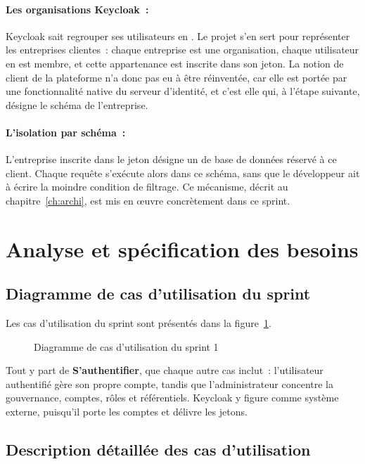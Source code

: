 \paragraph{Les organisations Keycloak~:} Keycloak sait regrouper ses utilisateurs en
. Le projet s'en sert pour représenter les entreprises clientes~: chaque
entreprise est une organisation, chaque utilisateur en est membre, et cette appartenance est inscrite
dans son jeton. La notion de client de la plateforme n'a donc pas eu à être réinventée, car elle est
portée par une fonctionnalité native du serveur d'identité, et c'est elle qui, à l'étape suivante,
désigne le schéma de l'entreprise.

\paragraph{L'isolation par schéma~:} L'entreprise inscrite dans le jeton désigne
un  de base de données réservé à ce client. Chaque requête s'exécute alors dans ce
schéma, sans que le développeur ait à écrire la moindre condition de filtrage. Ce
mécanisme, décrit au chapitre~\ref{ch:archi}, est mis en \oe uvre concrètement dans ce sprint.

\section{Analyse et spécification des besoins}

\subsection{Diagramme de cas d'utilisation du sprint}

Les cas d'utilisation du sprint sont présentés dans la figure~\ref{fig:uc-s1}.

\begin{figure}[H]
\centering
{}
\caption{Diagramme de cas d'utilisation du sprint 1}
\label{fig:uc-s1}
\end{figure}

Tout y part de \textbf{S'authentifier}, que chaque autre cas inclut~: l'utilisateur authentifié gère
son propre compte, tandis que l'administrateur concentre la gouvernance, comptes, rôles et
référentiels. Keycloak y figure comme système externe, puisqu'il porte les comptes et délivre les
jetons.

\subsection{Description détaillée des cas d'utilisation}

